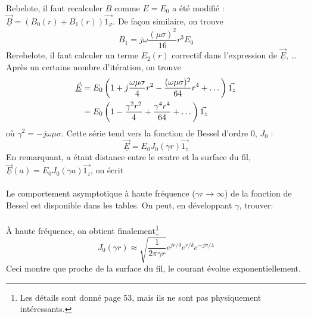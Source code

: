 Rebelote, il faut recalculer $B$ comme $E=E_0$ a été modifié : $\vec{\underline{B}} = (B_0(r)+
B_1(r))\vec{1_\varphi}$. De façon similaire, on trouve
\begin{equation}
B_1=j\omega\dfrac{(\mu\sigma)^2}{16}r^3E_0
\end{equation}
Rerebelote, il faut calculer un terme $E_2(r)$ correctif dans l'expression de $\vec{\underline{E}}$, 
\dots Après un certains nombre d'itération, on trouve
\begin{equation}
\begin{split}
\vec{\underline{E}} &= \displaystyle E_0\left(1+j\dfrac{\omega\mu\sigma}{4}r^2-\dfrac{(\omega\mu\sigma)^2}{64}r^4
+\dots\right)\vec{1_z}\\
&= \displaystyle E_0\left(1-\dfrac{\gamma^2r^2}{4}+\dfrac{\gamma^4r^4}{64}+\dots\right)\vec{1_z}
\end{split}
\end{equation}
où $\gamma^2=-j\omega\mu\sigma$. Cette série tend vers la fonction de Bessel d'ordre 0, $J_0$ :
\begin{equation}
\vec{\underline{E}} = E_0J_0(\gamma r)\vec{1_z}
\end{equation}
En remarquant, $a$ étant distance entre le centre et la surface du fil, $\vec{\underline{E}}(a) = E_0J_0(\gamma a)\vec{1_z}$, on écrit\\

\ \\

Le comportement asymptotique à haute fréquence ($\gamma r \rightarrow\infty$) de la fonction de 
Bessel est disponible dans les tables. On peut, en développant $\gamma$, trouver:\\
\ \\

À  haute fréquence, on obtient finalement\footnote{Les détails sont donné page 53, mais ils 
ne sont pas physiquement intéressants.} 
\begin{equation}
J_0(\gamma r) \approx \sqrt{\dfrac{1}{2\pi\gamma r}}e^{jr/\delta}e^{r/\delta}e^{-j\pi/4}
\end{equation}
Ceci montre que proche de la surface du fil, le courant évolue exponentiellement.

